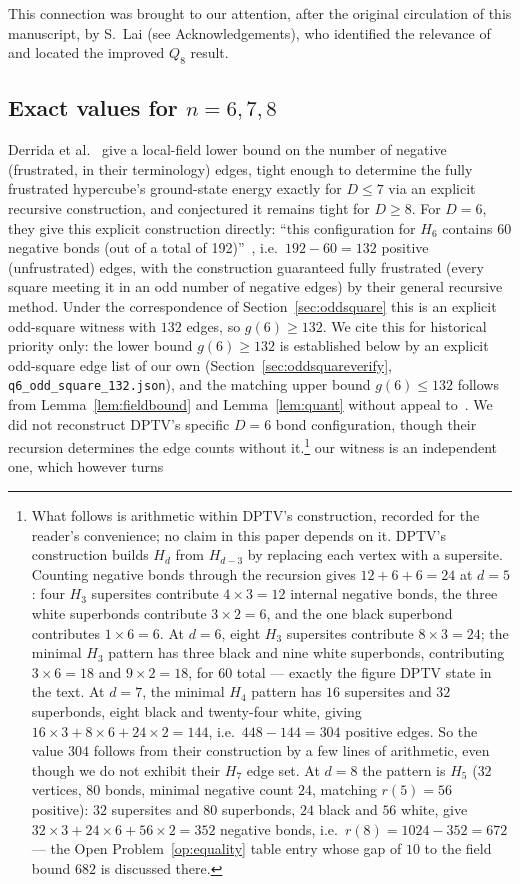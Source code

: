 \documentclass[12pt,a4paper]{article}
\theoremstyle{definition}
\begin{document}
This connection was brought to our attention, after the original circulation
of this manuscript, by S.~Lai (see Acknowledgements), who identified the
relevance of~\cite{DPTV79,MPR95} and located the improved $Q_8$ result.

\subsection{Exact values for \texorpdfstring{$n=6,7,8$}{n=6,7,8}}\label{sec:oddsquare-exact}

Derrida et al.~\cite{DPTV79} give a local-field lower bound on the number of
negative (frustrated, in their terminology) edges, tight enough to
determine the fully frustrated hypercube's ground-state energy exactly
for $D\le7$ via an explicit recursive construction, and conjectured it
remains tight for $D\ge8$. For $D=6$, they give this explicit
construction directly: ``this configuration for $H_6$ contains 60
negative bonds (out of a total of 192)''~\cite[p.~622]{DPTV79}, i.e.\
$192-60=132$ positive (unfrustrated) edges, with the construction
guaranteed fully frustrated (every square meeting it in an odd number
of negative edges) by their general recursive method. Under the
correspondence of Section~\ref{sec:oddsquare} this is an explicit
odd-square witness with $132$ edges, so $g(6)\ge132$. We cite this for
historical priority only: the lower bound $g(6)\ge132$ is established
below by an explicit odd-square edge list of our own
(Section~\ref{sec:oddsquareverify}, \texttt{q6\_odd\_square\_132.json}),
and the matching upper bound $g(6)\le132$ follows from
Lemma~\ref{lem:fieldbound} and Lemma~\ref{lem:quant} without appeal
to~\cite{HN94}. We did not reconstruct DPTV's specific $D=6$ bond
configuration, though their recursion determines the edge counts without
it.\footnote{What follows is arithmetic within DPTV's construction, recorded for
the reader's convenience; no claim in this paper depends on it.
DPTV's construction builds $H_d$ from $H_{d-3}$ by replacing each
vertex with a supersite. Counting negative bonds through the recursion gives
$12+6+6=24$ at $d=5$: four $H_3$ supersites contribute $4\times3=12$
internal negative bonds, the three white superbonds contribute
$3\times2=6$, and the one black superbond contributes $1\times6=6$.
At $d=6$, eight $H_3$ supersites contribute $8\times3=24$; the
minimal $H_3$ pattern has three black and nine white superbonds, contributing
$3\times6=18$ and $9\times2=18$, for $60$ total --- exactly the figure
DPTV state in the text. At $d=7$, the minimal $H_4$ pattern has $16$
supersites and $32$ superbonds, eight black and twenty-four white, giving
$16\times3+8\times6+24\times2=144$, i.e.\ $448-144=304$ positive edges. So the value $304$ follows from their construction by a few
lines of arithmetic, even though we do not exhibit their $H_7$ edge set.
At $d=8$ the pattern is $H_5$ ($32$ vertices, $80$ bonds, minimal negative
count $24$, matching $r(5)=56$ positive): $32$ supersites and $80$
superbonds, $24$ black and $56$ white, give
$32\times3+24\times6+56\times2=352$ negative bonds, i.e.\
$r(8)=1024-352=672$ --- the Open Problem~\ref{op:equality} table entry whose
gap of $10$ to the field bound $682$ is discussed there.} our witness is an independent one, which however turns
\end{document}
